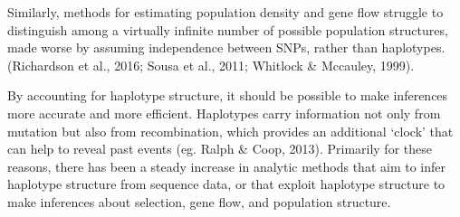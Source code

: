 \documentclass[twocolumn]{bmcart}%
\begin{document}
Similarly, methods for estimating population density and gene flow struggle to distinguish among a virtually infinite number of possible population structures, made worse by assuming independence between SNPs, rather than haplotypes.  (Richardson et al., 2016; Sousa et al., 2011; Whitlock \& Mccauley, 1999). 


By accounting for haplotype structure, it should be possible to make inferences more accurate and more efficient. Haplotypes carry information not only from mutation but also from recombination, which provides an additional ‘clock’ that can help to reveal past events (eg. Ralph \& Coop, 2013). Primarily for these reasons, there has been a steady increase in analytic methods that aim to infer haplotype structure from sequence data, or that exploit haplotype structure to make inferences about selection, gene flow, and population structure.
\end{document}
